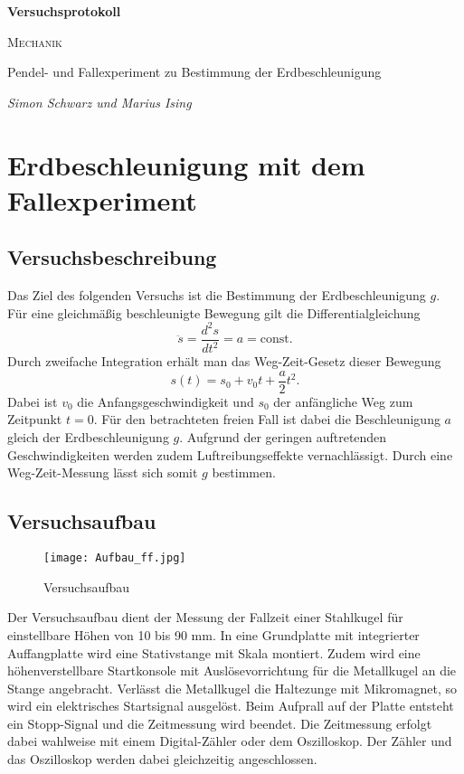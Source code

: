 \documentclass[a4paper, 12pt]{scrartcl}
\begin{document}
\begin{titlepage}
	\centering
	{\Huge\bfseries Versuchsprotokoll\par}
	\vspace{2cm}
	{\scshape\LARGE Mechanik \par}
	\vspace{1cm}
	{\Large Pendel- und Fallexperiment zu Bestimmung der Erdbeschleunigung\par}
	\vfill
	{\large\itshape Simon Schwarz und Marius Ising\par}

	\vfill
\end{titlepage}

\tableofcontents
\newpage

\section{Erdbeschleunigung mit dem Fallexperiment}


\subsection{Versuchsbeschreibung}

Das Ziel des folgenden Versuchs ist die Bestimmung der Erdbeschleunigung $g$. Für eine gleichmäßig beschleunigte Bewegung gilt die Differentialgleichung
$$\ddot s = \frac{d^2s}{dt^2} = a = \mathrm{const}.$$
Durch zweifache Integration erhält man das Weg-Zeit-Gesetz dieser Bewegung
$$s(t) = s_0 + v_0t + \frac a2 t^2.$$
Dabei ist $v_0$ die Anfangsgeschwindigkeit und $s_0$ der anfängliche Weg zum Zeitpunkt $t=0$. Für den betrachteten freien Fall ist dabei die Beschleunigung $a$ gleich der Erdbeschleunigung $g$. Aufgrund der geringen auftretenden Geschwindigkeiten werden zudem Luftreibungseffekte vernachlässigt. Durch eine Weg-Zeit-Messung lässt sich somit $g$ bestimmen.


\subsection{Versuchsaufbau}

\begin{figure}[h]
	\centering
	\texttt{[image: Aufbau\_ff.jpg]}
	\caption{Versuchsaufbau}
\end{figure}
Der Versuchsaufbau dient der Messung der Fallzeit einer Stahlkugel für einstellbare Höhen von 10 bis 90 mm. In eine Grundplatte mit integrierter Auffangplatte wird eine Stativstange mit Skala montiert. Zudem wird eine höhenverstellbare Startkonsole mit Auslösevorrichtung für die Metallkugel an die Stange angebracht. Verlässt die Metallkugel die Haltezunge mit Mikromagnet, so wird ein elektrisches Startsignal ausgelöst. Beim Aufprall auf der Platte entsteht ein Stopp-Signal und die Zeitmessung wird beendet. Die Zeitmessung erfolgt dabei wahlweise mit einem Digital-Zähler oder dem Oszilloskop. Der Zähler und das Oszilloskop werden dabei gleichzeitig angeschlossen.
\end{document}

